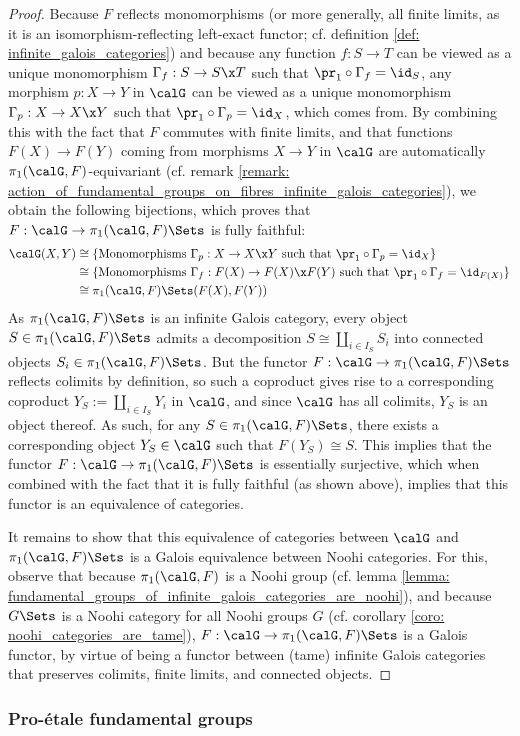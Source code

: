                 \begin{proof}
                    Because $F$ reflects monomorphisms (or more generally, all finite limits, as it is an isomorphism-reflecting left-exact functor; cf. definition \ref{def: infinite_galois_categories}) and because any function $f: S \to T$ can be viewed as a unique monomorphism $\Gamma_f: S \to S \x T$ such that $\pr_1 \circ \Gamma_f = \id_S$, any morphism $p: X \to Y$ in $\calG$ can be viewed as a unique monomorphism $\Gamma_p: X \to X \x Y$ such that $\pr_1 \circ \Gamma_p = \id_X$, which comes from. By combining this with the fact that $F$ commutes with finite limits, and that functions $F(X) \to F(Y)$ coming from morphisms $X \to Y$ in $\calG$ are automatically $\pi_1(\calG, F)$-equivariant (cf. remark \ref{remark: action_of_fundamental_groups_on_fibres_infinite_galois_categories}), we obtain the following bijections, which proves that $F: \calG \to \pi_1(\calG, F)\-\Sets$ is fully faithful:
                        $$
                            \begin{aligned}
                                \calG(X, Y) & \cong \{\text{Monomorphisms $\Gamma_p: X \to X \x Y$ such that $\pr_1 \circ \Gamma_p = \id_X$}\}
                                \\
                                & \cong \{\text{Monomorphisms $\Gamma_f: F(X) \to F(X) \x F(Y)$ such that $\pr_1 \circ \Gamma_f = \id_{F(X)}$}\} 
                                \\
                                & \cong \pi_1(\calG, F)\-\Sets(F(X), F(Y))
                            \end{aligned}
                        $$
                    As $\pi_1(\calG, F)\-\Sets$ is an infinite Galois category, every object $S \in \pi_1(\calG, F)\-\Sets$ admits a decomposition $S \cong \coprod_{i \in I_S} S_i$ into connected objects $S_i \in \pi_1(\calG, F)\-\Sets$. But the functor $F: \calG \to \pi_1(\calG, F)\-\Sets$ reflects colimits by definition, so such a coproduct gives rise to a corresponding coproduct $Y_S := \coprod_{i \in I_S} Y_i$ in $\calG$, and since $\calG$ has all colimits, $Y_S$ is an object thereof. As such, for any $S \in \pi_1(\calG, F)\-\Sets$, there exists a corresponding object $Y_S \in \calG$ such that $F(Y_S) \cong S$. This implies that the functor $F: \calG \to \pi_1(\calG, F)\-\Sets$ is essentially surjective, which when combined with the fact that it is fully faithful (as shown above), implies that this functor is an equivalence of categories. 
                    
                    It remains to show that this equivalence of categories between $\calG$ and $\pi_1(\calG, F)\-\Sets$ is a Galois equivalence between Noohi categories. For this, observe that because $\pi_1(\calG, F)$ is a Noohi group (cf. lemma \ref{lemma: fundamental_groups_of_infinite_galois_categories_are_noohi}), and because $G\-\Sets$ is a Noohi category for all Noohi groups $G$ (cf. corollary \ref{coro: noohi_categories_are_tame}), $F: \calG \to \pi_1(\calG, F)\-\Sets$ is a Galois functor, by virtue of being a functor between (tame) infinite Galois categories that preserves colimits, finite limits, and connected objects.
                \end{proof}
            
        \subsubsection{Pro-\'etale fundamental groups}